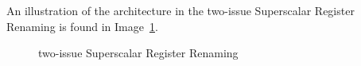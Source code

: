 \documentclass[english]{article}
\begin{document}
An illustration of the architecture in the two-issue Superscalar Register Renaming is found in Image~\ref{fig:two-issue-superscalar-register-renaming}.

\begin{figure}[htbp]
  \bigskip
  \centering
  \caption{two-issue Superscalar Register Renaming}
  \label{fig:two-issue-superscalar-register-renaming}
  \bigskip
\end{figure}
\end{document}
